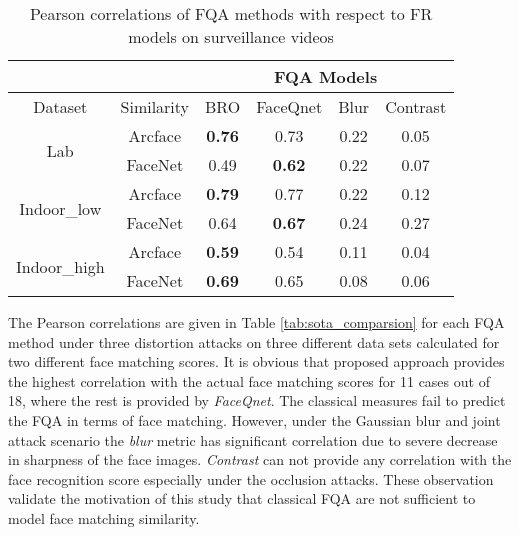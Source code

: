 \documentclass[runningheads]{llncs}
\begin{document}
\begin{table*}[h]
\centering
    \caption{Pearson correlations of FQA methods with respect to FR models on surveillance videos}
        \begin{tabular}{c c | c c c c}
            \toprule
            \midrule
                \multicolumn{2}{c}{} & \multicolumn{4}{c}{FQA Models}\\
                \hline
                {Dataset} & Similarity & {BRO} & {FaceQnet} & {Blur} & {Contrast} \\ 
                \hline
                \multirow{2}{*}{Lab} & Arcface & \textbf{0.76} & 0.73 & 0.22 & 0.05  \\
               & FaceNet & 0.49 & \textbf{0.62} & 0.22 & 0.07 \\
                \hline
               \multirow{2}{*}{Indoor\_low} & Arcface & \textbf{0.79} & 0.77 & 0.22 & 0.12 \\
              & FaceNet & 0.64 & \textbf{0.67} & 0.24 & 0.27  \\
                \hline
                \multirow{2}{*}{Indoor\_high} & Arcface & \textbf{0.59} & 0.54 & 0.11 & 0.04 \\
                & FaceNet & \textbf{0.69} & 0.65 & 0.08 & 0.06 \\
            \midrule
            \bottomrule
        \end{tabular}
    \label{tab:surveillance}
\centering
\end{table*}

The Pearson correlations are given in Table \ref{tab:sota_comparsion} for each FQA method under three distortion attacks on three different data sets calculated for two different face matching scores. It is obvious that proposed approach provides the highest correlation with the actual face matching scores for 11 cases out of 18, where the rest is provided by \textit{FaceQnet}. The classical measures fail to predict the FQA in terms of face matching. However, under the Gaussian blur and joint attack scenario the \textit{blur} metric has significant correlation due to severe decrease in sharpness of the face images. \textit{Contrast} can not provide any correlation with the face recognition score especially under the occlusion attacks. These observation validate the motivation of this study that classical FQA are not sufficient to model face matching similarity. 
\end{document}
